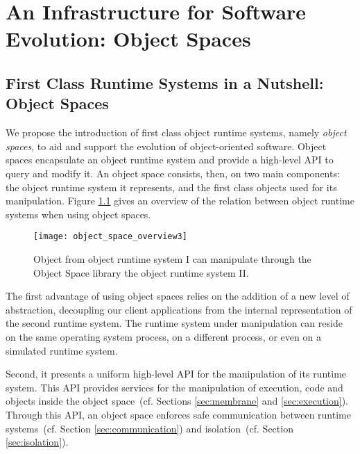 

\chapter{An Infrastructure for Software Evolution: Object Spaces}
\minitoc
\introduction


\section{First Class Runtime Systems in a Nutshell: Object Spaces}

We propose the introduction of first class object runtime systems, namely \emph{object spaces}, to aid and support the evolution of object-oriented software.
Object spaces encapsulate an object runtime system and provide a high-level API to query and modify it. An object space consists, then, on two main components: the object runtime system it represents, and the first class objects used for its manipulation. Figure \ref{fig:objectSpaceOverview} gives an overview of the relation between object runtime systems when using object spaces.

\begin{figure}[htb]
\begin{center}
\texttt{[image: object\_space\_overview3]}
\caption{Object from object runtime system I can manipulate through the Object Space library the object runtime system II.\label{fig:objectSpaceOverview}}
\end{center}
\end{figure}

The first advantage of using object spaces relies on the addition of a new level of abstraction, decoupling our client applications from the internal representation of the second runtime system. The runtime system under manipulation can reside \eg on the same operating system process, on a different process, or even on a simulated runtime system.

Second, it presents a uniform high-level API for the manipulation of its runtime system. This API provides services for the manipulation of execution, code and objects inside the object space~(cf. Sections \ref{sec:membrane} and \ref{sec:execution}). Through this API, an object space enforces safe communication between runtime systems~(cf. Section \ref{sec:communication}) and isolation~(cf. Section \ref{sec:isolation}).

